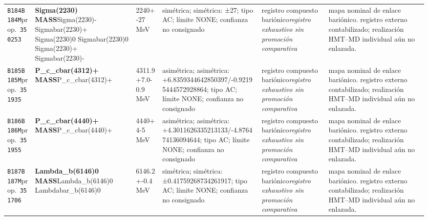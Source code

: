 \begin{landscape}
\begin{longtable}{L{1.85cm}L{4.45cm}L{2.35cm}L{4.05cm}L{3.35cm}L{7.15cm}}
\texttt{B184}\newline \texttt{B184M}\newline prop.\ \texttt{350253} & \textbf{Sigma(2230) MASS}\newline Sigma(2230)- \textbar{}\allowbreak{} Sigmabar(2230)+ \textbar{}\allowbreak{} Sigma(2230)0 \textbar{}\allowbreak{} Sigmabar(2230)0 \textbar{}\allowbreak{} Sigma(2230)+ \textbar{}\allowbreak{} Sigmabar(2230)- & 2240+-27\,MeV & simétrica; simétrica: ±27; tipo AC; límite NONE; confianza no consignado & registro compuesto bariónico\newline \emph{registro exhaustivo sin promoción comparativa} & mapa nominal de enlace bariónico. registro externo contabilizado; realización HMT--MD individual aún no enlazada. \\
\texttt{B185}\newline \texttt{B185M}\newline prop.\ \texttt{351935} & \textbf{P\_\allowbreak{}c\_\allowbreak{}cbar(4312)+ MASS}\newline P\_\allowbreak{}c\_\allowbreak{}cbar(4312)+ & 4311.9+7.0-0.9\,MeV & asimétrica; asimétrica: +6.8359344642850397/-0.92195444572928864; tipo AC; límite NONE; confianza no consignado & registro compuesto bariónico\newline \emph{registro exhaustivo sin promoción comparativa} & mapa nominal de enlace bariónico. registro externo contabilizado; realización HMT--MD individual aún no enlazada. \\
\texttt{B186}\newline \texttt{B186M}\newline prop.\ \texttt{351955} & \textbf{P\_\allowbreak{}c\_\allowbreak{}cbar(4440)+ MASS}\newline P\_\allowbreak{}c\_\allowbreak{}cbar(4440)+ & 4440+4-5\,MeV & asimétrica; asimétrica: +4.3011626335213133/-4.876474136094644; tipo AC; límite NONE; confianza no consignado & registro compuesto bariónico\newline \emph{registro exhaustivo sin promoción comparativa} & mapa nominal de enlace bariónico. registro externo contabilizado; realización HMT--MD individual aún no enlazada. \\
\texttt{B187}\newline \texttt{B187M}\newline prop.\ \texttt{351706} & \textbf{Lambda\_\allowbreak{}b(6146)0 MASS}\newline Lambda\_\allowbreak{}b(6146)0 \textbar{}\allowbreak{} Lambdabar\_\allowbreak{}b(6146)0 & 6146.2+-0.4\,MeV & simétrica; simétrica: ±0.41759268734261917; tipo AC; límite NONE; confianza no consignado & registro compuesto bariónico\newline \emph{registro exhaustivo sin promoción comparativa} & mapa nominal de enlace bariónico. registro externo contabilizado; realización HMT--MD individual aún no enlazada. \\

\end{longtable}
\end{landscape}

